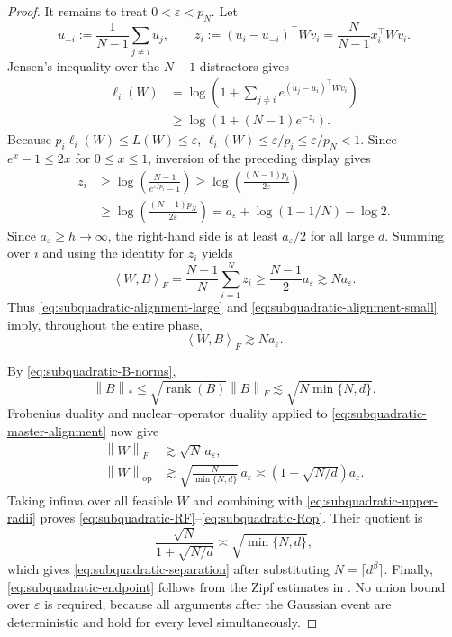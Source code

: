 \documentclass[11pt]{article}
\theoremstyle{definition}
\newcommand{\ip}[2]{\left\langle #1,#2\right\rangle_F}
\newcommand{\normF}[1]{\left\lVert #1\right\rVert_F}
\newcommand{\normop}[1]{\left\lVert #1\right\rVert_{\mathrm{op}}}
\newcommand{\normnuc}[1]{\left\lVert #1\right\rVert_*}
\newcommand{\eps}{\varepsilon}
\begin{document}
\begin{proof}
It remains to treat $0<\eps<p_N$.  Let
\[
 \bar u_{-i}:=\frac1{N-1}\sum_{j\neq i}u_j,
 \qquad
 z_i:=(u_i-\bar u_{-i})^\top Wv_i
 =\frac N{N-1}x_i^\top Wv_i.
\]
Jensen's inequality over the $N-1$ distractors gives
\begin{align*}
 \ell_i(W)
 &=\log\left(1+\sum_{j\neq i}
 e^{(u_j-u_i)^\top Wv_i}\right)\\
 &\geq\log\left(1+(N-1)e^{-z_i}\right).
\end{align*}
Because $p_i\ell_i(W)\leq L(W)\leq\eps$,
$\ell_i(W)\leq\eps/p_i\leq\eps/p_N<1$.  Since
$e^x-1\leq2x$ for $0\leq x\leq1$, inversion of the preceding display
gives
\begin{align}
 z_i
 &\geq\log\left(\frac{N-1}{e^{\eps/p_i}-1}\right)
 \geq\log\left(\frac{(N-1)p_i}{2\eps}\right)
 \nonumber\\
 &\geq\log\left(\frac{(N-1)p_N}{2\eps}\right)
 =a_\eps+\log(1-1/N)-\log2.
 \label{eq:subquadratic-individual-margin}
\end{align}
Since $a_\eps\geq h\to\infty$, the right-hand side is at least
$a_\eps/2$ for all large $d$.  Summing over $i$ and using the identity
for $z_i$ yields
\begin{equation}
 \ip{W}{B}
 =\frac{N-1}{N}\sum_{i=1}^Nz_i
 \geq\frac{N-1}{2}a_\eps
 \gtrsim Na_\eps.
 \label{eq:subquadratic-alignment-small}
\end{equation}
Thus \eqref{eq:subquadratic-alignment-large} and
\eqref{eq:subquadratic-alignment-small} imply, throughout the entire
phase,
\begin{equation}
 \ip{W}{B}\gtrsim Na_\eps.
 \label{eq:subquadratic-master-alignment}
\end{equation}

By \eqref{eq:subquadratic-B-norms},
\[
 \normnuc{B}
 \leq\sqrt{\operatorname{rank}(B)}\normF{B}
 \lesssim\sqrt{N\min\{N,d\}}.
\]
Frobenius duality and nuclear--operator duality applied to
\eqref{eq:subquadratic-master-alignment} now give
\begin{align}
 \normF{W}
 &\gtrsim\sqrt N\,a_\eps,
 \label{eq:subquadratic-lower-F}\\
 \normop{W}
 &\gtrsim
 \sqrt{\frac{N}{\min\{N,d\}}}\,a_\eps
 \asymp
 \left(1+\sqrt{N/d}\right)a_\eps.
 \label{eq:subquadratic-lower-op}
\end{align}
Taking infima over all feasible $W$ and combining with
\eqref{eq:subquadratic-upper-radii} proves
\eqref{eq:subquadratic-RF}--\eqref{eq:subquadratic-Rop}.  Their quotient
is
\[
 \frac{\sqrt N}{1+\sqrt{N/d}}
 \asymp\sqrt{\min\{N,d\}},
\]
which gives \eqref{eq:subquadratic-separation} after substituting
$N=\lceil d^\beta\rceil$.  Finally,
\eqref{eq:subquadratic-endpoint} follows from the Zipf estimates in
.  No union bound over $\eps$ is required, because all
arguments after the Gaussian event are deterministic and hold for every
level simultaneously.
\end{proof}
\end{document}
